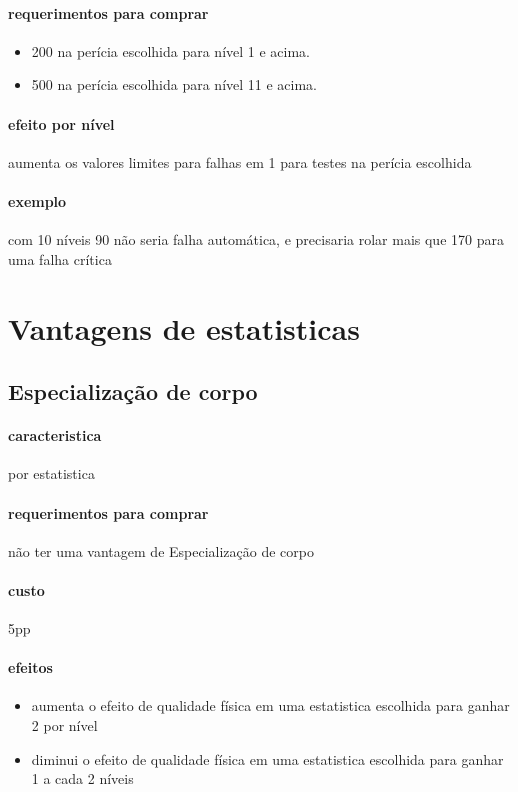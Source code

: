 \paragraph{requerimentos para comprar}
\begin{itemize}
  \item 200 na perícia escolhida para nível 1 e acima.
  \item 500 na perícia escolhida para nível 11 e acima.
\end{itemize}
\paragraph{efeito por nível} aumenta os valores limites para falhas em 1 para testes na perícia escolhida
\paragraph{exemplo} com 10 níveis 90 não seria falha automática, e precisaria rolar mais que 170 para uma falha crítica
%
%
\section{Vantagens de estatisticas}
%
\subsection{Especialização de corpo}
\paragraph{caracteristica} por estatistica
\paragraph{requerimentos para comprar} não ter uma vantagem de Especialização de corpo
\paragraph{custo} 5pp
\paragraph{efeitos}
\begin{itemize}
  \item aumenta o efeito de qualidade física em uma estatistica escolhida para ganhar 2 por nível
  \item diminui o efeito de qualidade física em uma estatistica escolhida para ganhar 1 a cada 2 níveis
\end{itemize}
%
